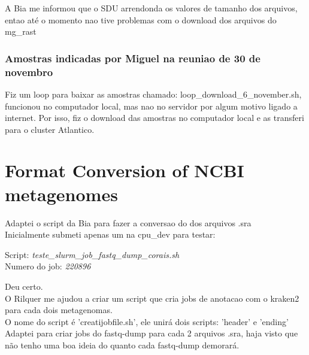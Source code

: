 \documentclass[12pt, a4paper]{report}
\begin{document}
A Bia me informou que o SDU arrendonda os valores de tamanho dos arquivos, entao até o momento nao
tive problemas com o download dos arquivos do mg\_rast

\subsection{Amostras indicadas por Miguel na reuniao de 30 de novembro}
Fiz um loop para baixar as amostras chamado: loop\_download\_6\_november.sh, funcionou no computador local, mas nao no servidor por algum motivo ligado a internet. Por isso, fiz o download das amostras no computador local e as transferi para o cluster Atlantico.


\chapter{Format Conversion of NCBI metagenomes}
 
Adaptei o script da Bia para fazer a conversao do dos arquivos .sra\\
Inicialmente submeti apenas um na cpu\_dev para testar:\\ 

\begin{tcolorbox}[width=5.3in]
 \scriptsize 
\normalsize  Script: \textit{teste\_slurm\_job\_fastq\_dump\_corais.sh}\\
\normalsize  Numero do job: \textit{220896}
 \end{tcolorbox}

Deu certo. \\
O Rilquer me ajudou a criar um script que cria jobs de anotacao com o kraken2 para cada dois metagenomas. \\
O nome do script é 'creatijobfile.sh', ele unirá dois scripts: 'header' e 'ending' \\
Adaptei para criar jobs do fastq-dump para cada 2 arquivos .sra, haja visto que não tenho uma boa ideia do quanto cada fastq-dump demorará. \\
\end{document}
